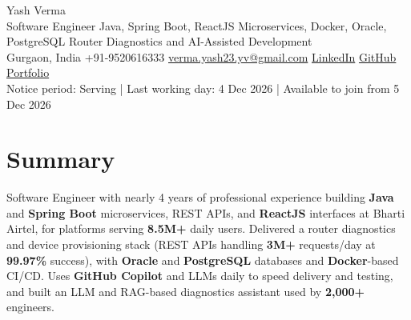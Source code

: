 \documentclass[letterpaper,10pt]{article}
\begin{document}
\begin{center}
  {\Huge Yash Verma} \\
  \small Software Engineer \textbar{} Java, Spring Boot, ReactJS \textbar{} Microservices, Docker, Oracle, PostgreSQL \textbar{} Router Diagnostics and AI-Assisted Development \\
  \small Gurgaon, India \textbar{} +91-9520616333 \textbar{} \href{mailto:verma.yash23.yv@gmail.com}{verma.yash23.yv@gmail.com} \textbar{}
  \href{https://www.linkedin.com/in/yash-verma-9243a7193/}{LinkedIn} \textbar{}
  \href{https://github.com/yashverma230600}{GitHub} \textbar{}
  \href{https://yashverma230600.github.io/yash-portfolio/}{Portfolio} \\
  Notice period: Serving | Last working day: 4 Dec 2026 | Available to join from 5 Dec 2026
  \vspace{-8pt}
\end{center}

\section{Summary}
\begin{itemize}[leftmargin=0.15in, label={}]
  \small{\item{
    Software Engineer with nearly 4 years of professional experience building \textbf{Java} and \textbf{Spring Boot} microservices, REST APIs, and \textbf{ReactJS} interfaces at Bharti Airtel, for platforms serving \textbf{8.5M+} daily users. Delivered a router diagnostics and device provisioning stack (REST APIs handling \textbf{3M+} requests/day at \textbf{99.97\%} success), with \textbf{Oracle} and \textbf{PostgreSQL} databases and \textbf{Docker}-based CI/CD. Uses \textbf{GitHub Copilot} and LLMs daily to speed delivery and testing, and built an LLM and RAG-based diagnostics assistant used by \textbf{2,000+} engineers.
  }}
\end{itemize}
\vspace{-8pt}

\end{document}
